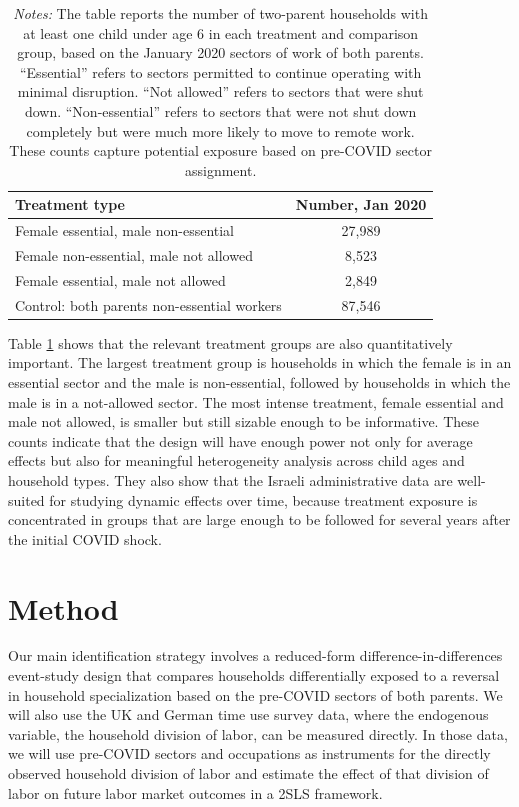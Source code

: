 \documentclass[12pt]{article}
\begin{document}
\begin{table}[t]
\centering
\caption{Treatment Status Based on January 2020}
\label{tab:treatment}
\begin{tabular}{lc}
\toprule
\textbf{Treatment type} & \textbf{Number, Jan 2020} \\
\midrule
Female essential, male non-essential & 27,989 \\
Female non-essential, male not allowed & 8,523 \\
Female essential, male not allowed & 2,849 \\
Control: both parents non-essential workers & 87,546 \\
\bottomrule
\end{tabular}
\caption*{\footnotesize \textit{Notes:} The table reports the number of two-parent households with at least one child under age 6 in each treatment and comparison group, based on the January 2020 sectors of work of both parents. ``Essential'' refers to sectors permitted to continue operating with minimal disruption. ``Not allowed'' refers to sectors that were shut down. ``Non-essential'' refers to sectors that were not shut down completely but were much more likely to move to remote work. These counts capture potential exposure based on pre-COVID sector assignment.}
\end{table}

Table \ref{tab:treatment} shows that the relevant treatment groups are also quantitatively important. The largest treatment group is households in which the female is in an essential sector and the male is non-essential, followed by households in which the male is in a not-allowed sector. The most intense treatment, female essential and male not allowed, is smaller but still sizable enough to be informative. These counts indicate that the design will have enough power not only for average effects but also for meaningful heterogeneity analysis across child ages and household types. They also show that the Israeli administrative data are well-suited for studying dynamic effects over time, because treatment exposure is concentrated in groups that are large enough to be followed for several years after the initial COVID shock.

\section{Method}

Our main identification strategy involves a reduced-form difference-in-differences event-study design that compares households differentially exposed to a reversal in household specialization based on the pre-COVID sectors of both parents. We will also use the UK and German time use survey data, where the endogenous variable, the household division of labor, can be measured directly. In those data, we will use pre-COVID sectors and occupations as instruments for the directly observed household division of labor and estimate the effect of that division of labor on future labor market outcomes in a 2SLS framework.
\end{document}
